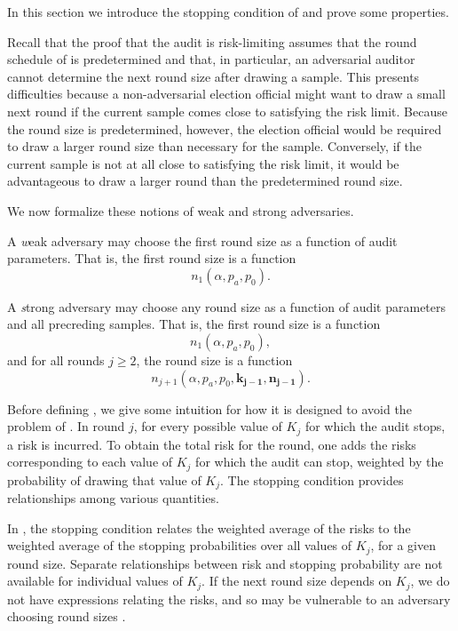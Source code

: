 In this section we introduce the stopping condition of \Providence and prove some properties.

Recall that the proof that the \Minerva audit is risk-limiting assumes that the round schedule of \Minerva is predetermined and that, in particular, an adversarial auditor cannot determine the next round size after drawing a sample. This presents difficulties because a non-adversarial election official might want to draw a small next round if the current sample comes close to satisfying the risk limit. Because the \Minerva round size is predetermined, however, the election official would be required to draw a larger round size than necessary for the sample. Conversely, if the current sample is not at all close to satisfying the risk limit, it would be advantageous to draw a larger round than the predetermined round size. 

We now formalize these notions of weak and strong adversaries.

\begin{definition}
A {\emph weak adversary} may choose the first round size as a function of audit parameters. That is, the first round size is a function $$n_1(\alpha, p_a, p_0).$$
\end{definition}

\begin{definition}
A {\emph strong adversary} may choose any round size as a function of audit parameters and all precreding samples. That is, the first round size is a function 
$$n_1(\alpha, p_a, p_0),$$
and for all rounds $j\ge 2$, the round size is a function
$$n_{j+1}(\alpha, p_a, p_0, \bm{k_{j-1}}, \bm{n_{j-1}}).$$
\end{definition}

Before defining \Providence, we give some intuition for how it is designed to avoid the problem of \Minerva.
In round $j$, for every possible value of $K_j$ for which the audit stops, a risk is incurred. To obtain the total risk for the round, one adds the risks corresponding to each value of $K_j$ for which the audit can stop, weighted by the probability of drawing that value of $K_j$. The stopping condition provides relationships among various quantities.

In \Minerva, the stopping condition relates the weighted average of the risks to the weighted average of the stopping probabilities over all values of $K_j$, for a given round size. Separate relationships between risk and stopping probability are not available for individual values of $K_j$. If the next round size depends on $K_j$, we do not have expressions relating the risks, and so \Minerva may be vulnerable to an adversary choosing round sizes \cite{usenix_minerva, arxiv_athena}. 

